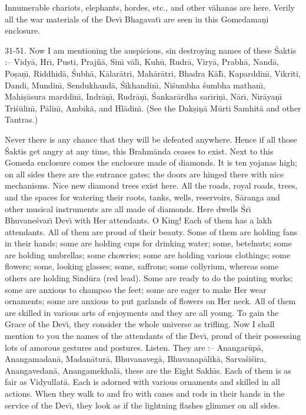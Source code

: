 Innumerable chariots, elephants, hordes, etc., and other v\=ahanas are here. Verily all the war materials of the Dev\={\i} Bhagavat\={\i} are seen in this Gomedama\d{n}i enclosure.

31-51. Now I am mentioning the auspicious, sin destroying names of these \'Saktis :-- Vidy\=a, Hr\={\i}, Pusti, Praj\~n\=a, Sin\={\i} v\=al\={\i}, Kuh\=u, Rudr\=a, Viry\=a, Prabh\=a, Nand\=a, Po\d{s}a\d{n}\={\i}, Riddhid\=a, \'Subh\=a, K\=alar\=atri, Mah\=ar\=atri, Bhadra K\=aI\={\i}, Kaparddin\={\i}, Vikriti, Dandi, Mundin\={\i}, Sendukhand\=a, \'Sikhandin\={\i}, Ni\'sumbha \'sumbha mathan\={\i}, Mahi\d{s}\=asura marddin\={\i}, Indr\=a\d{n}\={\i}, Rudr\=a\d{n}\={\i}, \'Sankar\=ardha sar\={\i}ri\d{n}\={\i}, N\=ar\={\i}, Nir\=aya\d{n}\={\i} Tri\'s\=ulin\={\i}, P\=alin\={\i}, Ambik\=a, and Hl\=adin\={\i}. (See the Dak\d{s}i\d{n}\=a M\=urti Samhit\=a and other Tantras.)

Never there is any chance that they will be defeated anywhere. Hence if all those \'Saktis get angry at any time, this Brahm\=anda ceases to exist. Next to this Gomeda enclosure comes the enclosure made of diamonds. It is ten yojanas high; on all sides there are the entrance gates; the doors are hinged there with nice mechanisms. Nice new diamond trees exist here. All the roads, royal roads, trees, and the spaces for watering their roots, tanks, wells, reservoirs, S\=aranga and other musical instruments are all made of diamonds. Here dwells \'Sr\={\i} Bhuvane\'svar\={\i} Dev\={\i} with Her attendants. O King! Each of them has a lakh attendants. All of them are proud of their beauty. Some of them are holding fans in their hands; some are holding cups for drinking water; some, betelnuts; some are holding umbrellas; some chowries; some are holding various clothings; some flowers; some, looking glasses; some, saffrons; some collyrium, whereas some others are holding Sind\=ura (red lead). Some are ready to do the painting works; some are anxious to champoo the feet; some are eager to make Her wear ornaments; some are anxious to put garlands of flowers on Her neck. All of them are skilled in various arts of enjoyments and they are all young. To gain the Grace of the Dev\={\i}, they consider the whole universe as trifling. Now I shall mention to you the names of the attendants of the Dev\={\i}, proud of their possessing lots of amorous gestures and postures. Listen. They are :-- Anangar\=up\=a, Anangamadan\=a, Madan\=atur\=a, Bhuvanaveg\=a, Bhuvanap\=alik\=a, Sarva\'si\'sira, Anangavedan\=a, Anangamekhal\=a, these are the Eight Sakh\={\i}s. Each of them is as fair as Vidyullat\=a. Each is adorned with various ornaments and skilled in all actions. When they walk to and fro with canes and rods in their hands in the service of the Dev\={\i}, they look as if the lightning flashes glimmer on all sides.

